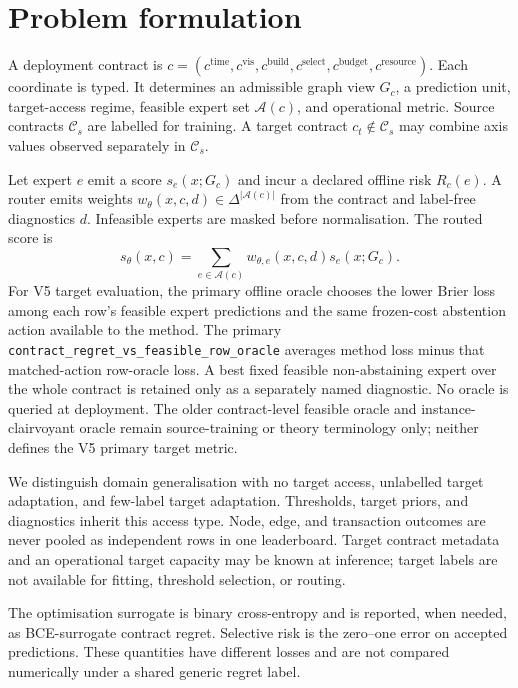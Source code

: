 \section{Problem formulation}

A deployment contract is
$c=(c^{\mathrm{time}},c^{\mathrm{vis}},c^{\mathrm{build}},
c^{\mathrm{select}},c^{\mathrm{budget}},c^{\mathrm{resource}})$.
Each coordinate is typed. It determines an admissible graph view
$G_c$, a prediction unit, target-access regime, feasible expert set
$\mathcal A(c)$, and operational metric. Source contracts
$\mathcal C_s$ are labelled for training. A target contract
$c_t\notin\mathcal C_s$ may combine axis values observed separately in
$\mathcal C_s$.

Let expert $e$ emit a score $s_e(x;G_c)$ and incur a declared offline risk
$R_c(e)$. A router emits weights
$w_\theta(x,c,d)\in\Delta^{|\mathcal A(c)|}$ from the contract and label-free
diagnostics $d$. Infeasible experts are masked before normalisation. The routed
score is
\[
  s_\theta(x,c)=\sum_{e\in\mathcal A(c)}w_{\theta,e}(x,c,d)s_e(x;G_c).
\]
For V5 target evaluation, the primary offline oracle chooses the lower Brier
loss among each row's feasible expert predictions and the same frozen-cost
abstention action available to the method. The primary
\texttt{contract\_regret\_vs\_feasible\_row\_oracle} averages method loss minus
that matched-action row-oracle loss. A best fixed feasible non-abstaining expert
over the whole contract is retained only as a separately named diagnostic. No
oracle is queried at deployment.
The older contract-level feasible oracle and instance-clairvoyant oracle remain
source-training or theory terminology only; neither defines the V5 primary
target metric.

We distinguish domain generalisation with no target access,
unlabelled target adaptation, and few-label target adaptation. Thresholds,
target priors, and diagnostics inherit this access type. Node, edge, and
transaction outcomes are never pooled as independent rows in one leaderboard.
Target contract metadata and an operational target capacity may be known at
inference; target labels are not available for fitting, threshold selection,
or routing.

The optimisation surrogate is binary cross-entropy and is reported, when
needed, as BCE-surrogate contract regret. Selective risk is the zero--one
error on accepted predictions. These quantities have different losses and are
not compared numerically under a shared generic regret label.

